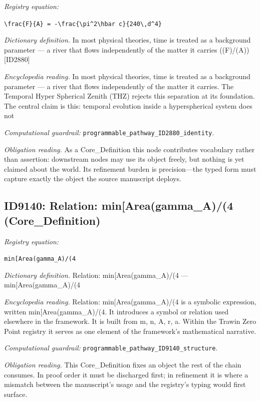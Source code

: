 \documentclass[11pt]{article}
\theoremstyle{remark}
\begin{document}
\noindent\textit{Registry equation:}\par
{\small\texttt{\textbackslash{}frac\{F\}\{A\} = -\textbackslash{}frac\{\textbackslash{}pi\textasciicircum{}2\textbackslash{}hbar c\}\{240\textbackslash{},d\textasciicircum{}4\}}}\par\medskip
\noindent\textit{Dictionary definition.} In most physical theories, time is treated as a background parameter --- a river that flows independently of the matter it carries ((F)/(A)) [ID2880]\par\medskip
\noindent\textit{Encyclopedia reading.} In most physical theories, time is treated as a background parameter --- a river that flows independently of the matter it carries. The Temporal Hyper Spherical Zenith (THZ) rejects this separation at its foundation. The central claim is this: temporal evolution inside a hyperspherical system does not
\par\medskip\noindent\textit{Computational guardrail:} \texttt{programmable\_pathway\_ID2880\_identity}.
\par\medskip\noindent\textit{Obligation reading.} As a Core\_Definition this node contributes vocabulary rather than assertion: downstream nodes may use its object freely, but nothing is yet claimed about the world. Its refinement burden is precision---the typed form must capture exactly the object the source manuscript deploys.

\subsection{ID9140: Relation: min[Area(gamma\_A)/(4 (Core\_Definition)}

\noindent\textit{Registry equation:}\par
{\small\texttt{min[Area(gamma\_A)/(4}}\par\medskip
\noindent\textit{Dictionary definition.} Relation: min[Area(gamma\_A)/(4 --- min[Area(gamma\_A)/(4\par\medskip
\noindent\textit{Encyclopedia reading.} Relation: min[Area(gamma\_A)/(4 is a symbolic expression, written min[Area(gamma\_A)/(4. It introduces a symbol or relation used elsewhere in the framework. It is built from m, n, A, r, a. Within the Trawin Zero Point registry it serves as one element of the framework's mathematical narrative.
\par\medskip\noindent\textit{Computational guardrail:} \texttt{programmable\_pathway\_ID9140\_structure}.
\par\medskip\noindent\textit{Obligation reading.} This Core\_Definition fixes an object the rest of the chain consumes. In proof order it must be discharged first; in refinement it is where a mismatch between the manuscript's usage and the registry's typing would first surface.
\end{document}
